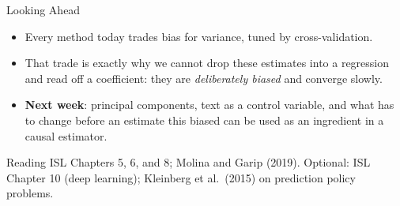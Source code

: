 \documentclass[aspectratio=169,11pt,xcolor=dvipsnames]{beamer}
\begin{document}
\begin{frame}{Looking Ahead}
\begin{itemize}\itemsep4pt
  \item Every method today trades bias for variance, tuned by cross-validation.
  \item That trade is exactly why we cannot drop these estimates into a regression
        and read off a coefficient: they are \emph{deliberately biased} and
        converge slowly.
  \item \textbf{Next week}: principal components, text as a control variable, and what has to change before an estimate this biased can
        be used as an ingredient in a causal estimator.
\end{itemize}
\vskip4pt
\begin{block}{Reading}
ISL Chapters 5, 6, and 8; Molina and Garip (2019). Optional: ISL Chapter 10
(deep learning); Kleinberg et al.\ (2015) on prediction policy problems.
\end{block}
\end{frame}
\end{document}
